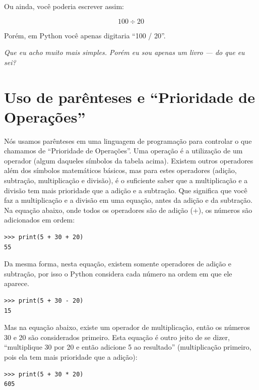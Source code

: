 Ou ainda, você poderia escrever assim:

\begin{displaymath}
100 \div 20
\end{displaymath}

Porém, em Python você apenas digitaria ``100 / 20''.

\emph{Que eu acho muito mais simples. Porém eu sou apenas um livro --- do que eu sei?}

\section{Uso de parênteses e ``Prioridade de Operações''}

Nós usamos parênteses em uma linguagem de programação para controlar o que chamamos de ``Prioridade de Operações''. Uma operação é a utilização de um operador (algum daqueles símbolos da tabela acima). Existem outros operadores além dos símbolos matemáticos básicos, mas para estes operadores (adição, subtração, multiplicação e divisão), é o suficiente saber que a multiplicação e a divisão tem mais prioridade que a adição e a subtração. Que significa que você faz a multiplicação e a divisão em uma equação, antes da adição e da subtração. Na equação abaixo, onde todos os operadores são de adição (+), os números são adicionados em ordem:

\begin{listing}
\begin{verbatim}
>>> print(5 + 30 + 20)
55
\end{verbatim}
\end{listing}

\noindent
Da mesma forma, nesta equação, existem somente operadores de adição e subtração, por isso o Python considera cada número na ordem em que ele aparece.

\begin{listing}
\begin{verbatim}
>>> print(5 + 30 - 20)
15
\end{verbatim}
\end{listing}

\noindent
Mas na equação abaixo, existe um operador de multiplicação, então os números 30 e 20 são considerados primeiro. Esta equação é outro jeito de se dizer, ``multiplique 30 por 20 e então adicione 5 ao resultado'' (multiplicação primeiro, pois ela tem mais prioridade que a adição):

\begin{listing}
\begin{verbatim}
>>> print(5 + 30 * 20)
605
\end{verbatim}
\end{listing}

